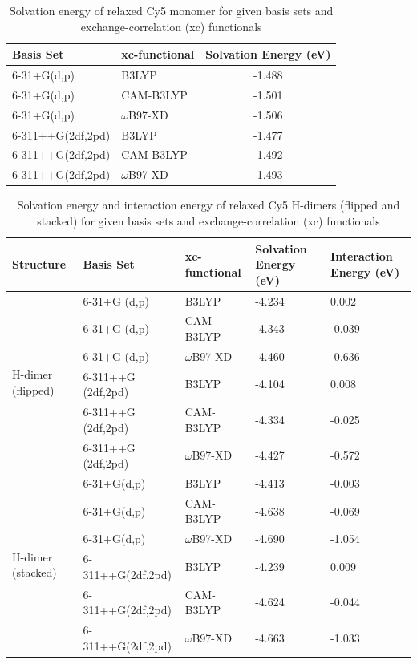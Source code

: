 \begin{table}[h]
\centering
\caption{Solvation energy of relaxed Cy5 monomer for given basis sets and exchange-correlation (xc) functionals} \label{tab:cy5-solvation}
\begin{tabular}{llc}
\hline
Basis Set & xc-functional & Solvation Energy (eV) \\ \hline
6-31+G(d,p) & B3LYP & -1.488 \\ 
6-31+G(d,p) & CAM-B3LYP & -1.501 \\ 
6-31+G(d,p) & $\omega$B97-XD & -1.506 \\ 
6-311++G(2df,2pd) & B3LYP & -1.477 \\ 
6-311++G(2df,2pd) & CAM-B3LYP & -1.492 \\ 
6-311++G(2df,2pd) & $\omega$B97-XD & -1.493 \\ 
\end{tabular}
\end{table}

\begin{table}[h]
\centering
\caption{Solvation energy and interaction energy of relaxed Cy5 H-dimers (flipped and stacked) for given basis sets and exchange-correlation (xc) functionals} \label{tab:h-solvation}
\begin{tabular}{lllp{15mm}p{20mm}}
\hline
Structure & Basis Set & xc-functional & Solvation Energy (eV) & Interaction Energy (eV) \\ \hline
\multirow{6}{*}{H-dimer (flipped)} & 6-31+G (d,p) & B3LYP & -4.234 & 0.002 \\ 
 & 6-31+G (d,p) & CAM-B3LYP & -4.343 & -0.039 \\ 
 & 6-31+G (d,p) & $\omega$B97-XD & -4.460 & -0.636 \\ 
 & 6-311++G (2df,2pd) & B3LYP & -4.104 & 0.008 \\ 
 & 6-311++G (2df,2pd) & CAM-B3LYP & -4.334 & -0.025 \\ 
 & 6-311++G (2df,2pd) & $\omega$B97-XD & -4.427 & -0.572 \\ \hline
\multirow{6}{*}{H-dimer (stacked)} & 6-31+G(d,p) & B3LYP & -4.413 & -0.003 \\ 
 & 6-31+G(d,p) & CAM-B3LYP & -4.638 & -0.069 \\ 
 & 6-31+G(d,p) & $\omega$B97-XD & -4.690 & -1.054 \\ 
 & 6-311++G(2df,2pd) & B3LYP & -4.239 & 0.009 \\ 
 & 6-311++G(2df,2pd) & CAM-B3LYP & -4.624 & -0.044 \\ 
 & 6-311++G(2df,2pd) & $\omega$B97-XD & -4.663 & -1.033 \\ \hline
\end{tabular}
\end{table}

